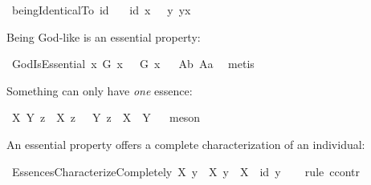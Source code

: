 \begin{isabellebody}
\isamarkupfalse%
\ beingIdenticalTo{\isacharcolon}{\isacharcolon}{\isachardoublequoteopen}{\isasymzero}{\isasymRightarrow}{\isasymup}{\isasymlangle}{\isasymzero}{\isasymrangle}{\isachardoublequoteclose}\ {\isacharparenleft}{\isachardoublequoteopen}id{\isachardoublequoteclose}{\isacharparenright}\ \isanewline
\ \ {\isachardoublequoteopen}id\ x\ \ {\isasymequiv}\ {\isacharparenleft}{\isasymlambda}y{\isachardot}\ y\isactrlbold {\isasymapprox}x{\isacharparenright}{\isachardoublequoteclose}\ %
%
\begin{isamarkuptext}%
Being God-like is an essential property:%
\end{isamarkuptext}\isamarkuptrue%
\isamarkupfalse%
\ GodIsEssential{\isacharcolon}\ {\isachardoublequoteopen}{\isasymlfloor}\isactrlbold {\isasymforall}x{\isachardot}\ G\ x\ \isactrlbold {\isasymrightarrow}\ {\isacharparenleft}{\isasymE}\ G\ x{\isacharparenright}{\isasymrfloor}{\isachardoublequoteclose}%
\ %
%
\isamarkupfalse%
\ A{}b\ A{}a\ \isamarkupfalse%
\ metis%
%
%
%
\begin{isamarkuptext}%
Something can only have \emph{one} essence:%
\end{isamarkuptext}\isamarkuptrue%
\isamarkupfalse%
\ {\isachardoublequoteopen}{\isasymlfloor}\isactrlbold {\isasymforall}X\ Y\ z{\isachardot}\ {\isacharparenleft}{\isasymE}\ X\ z\ \isactrlbold {\isasymand}\ {\isasymE}\ Y\ z{\isacharparenright}\ \isactrlbold {\isasymrightarrow}\ {\isacharparenleft}X\ {\isasymRrightarrow}\ Y{\isacharparenright}{\isasymrfloor}{\isachardoublequoteclose}%
\ %
%
\isamarkupfalse%
\ meson%
%
%
%
\begin{isamarkuptext}%
An essential property offers a complete characterization of an individual:%
\end{isamarkuptext}\isamarkuptrue%
\isamarkupfalse%
\ EssencesCharacterizeCompletely{\isacharcolon}\ {\isachardoublequoteopen}{\isasymlfloor}\isactrlbold {\isasymforall}X\ y{\isachardot}\ {\isasymE}\ X\ y\ \isactrlbold {\isasymrightarrow}\ {\isacharparenleft}X\ {\isasymRrightarrow}\ {\isacharparenleft}id\ y{\isacharparenright}{\isacharparenright}{\isasymrfloor}{\isachardoublequoteclose}\isanewline
%
\ \ %
%
\isamarkupfalse%
\ {\isacharparenleft}rule\ ccontr{\isacharparenright}\ %
\isanewline

\end{isabellebody}
